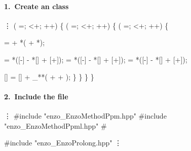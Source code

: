 
\begin{frame}[fragile] 
\secframetitle{\ssAddMethod}
\framesubtitle{1.~Create an  class}
\begin{semiverbatim}\scriptsize
        \vdots
    ( =; <+; ++) \{
       ( =; <+; ++) \{
          ( =; <+; ++) \{

              =  + *( + *);

              = *([-] - *[] + [+]);
              = *([-] - *[] + [+]);
              = *([-] - *[] + [+]);

            [] = [] + _**( +  + );
         \}
      \}
   \}
\}
\end{semiverbatim}
\end{frame}


\begin{frame}[fragile] 
\secframetitle{\ssAddMethod}
\framesubtitle{2.~Include the  file}
%
\begin{semiverbatim}
       \vdots
   #include "enzo_EnzoMethodPpm.hpp"
   #include "enzo_EnzoMethodPpml.hpp"
   # 

   #include "enzo_EnzoProlong.hpp"
       \vdots
\end{semiverbatim}


\end{frame}

